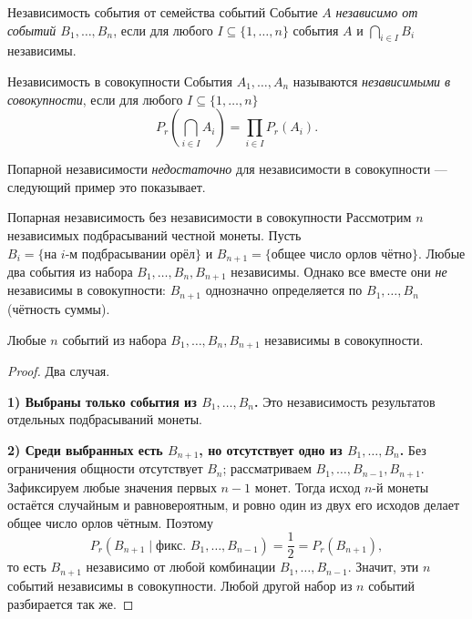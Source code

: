 \begin{Definition}{Независимость события от семейства событий}{}
	Событие \(A\) \textit{независимо от событий \(B_1,\dots,B_n\)}, если для любого $I\subseteq \{1,\dots,n\}$ события $A$ и $\bigcap_{i\in I} B_i$ независимы.
\end{Definition}

\begin{Definition}{Независимость в совокупности}{}
	События \(A_1,\dots,A_n\) называются \textit{независимыми в совокупности}, если для любого $I\subseteq \{1,\dots,n\}$
	\[
	P_r\!\left(\bigcap_{i\in I} A_i\right)=\prod_{i\in I} P_r(A_i).
	\]
\end{Definition}

\begin{Remark}{}{}
	Попарной независимости \emph{недостаточно} для независимости в совокупности — следующий пример это показывает.
\end{Remark}

\begin{Example}{Попарная независимость без независимости в совокупности}{}
	Рассмотрим \(n\) независимых подбрасываний честной монеты. Пусть $B_i=\{\text{на }i\text{-м подбрасывании орёл}\}$ и $B_{n+1}=\{\text{общее число орлов чётно}\}$. Любые два события из набора $B_1,\dots,B_n,B_{n+1}$ независимы. Однако все вместе они \emph{не} независимы в совокупности: $B_{n+1}$ однозначно определяется по $B_1,\dots,B_n$ (чётность суммы).
\end{Example}

\begin{Statement}{}{}
	Любые \(n\) событий из набора $B_1,\dots,B_n,B_{n+1}$ независимы в совокупности.
\end{Statement}

\begin{proof}
	Два случая.

	\textbf{1) Выбраны только события из \(B_1,\dots,B_n\).} Это независимость результатов отдельных подбрасываний монеты.

	\textbf{2) Среди выбранных есть \(B_{n+1}\), но отсутствует одно из \(B_1,\dots,B_n\).} Без ограничения общности отсутствует $B_n$; рассматриваем $B_1,\dots,B_{n-1},B_{n+1}$. Зафиксируем любые значения первых $n-1$ монет. Тогда исход $n$-й монеты остаётся случайным и равновероятным, и ровно один из двух его исходов делает общее число орлов чётным. Поэтому
	\[
	P_r(B_{n+1}\mid \text{фикс. }B_1,\dots,B_{n-1})=\frac12=P_r(B_{n+1}),
	\]
	то есть $B_{n+1}$ независимо от любой комбинации $B_1,\dots,B_{n-1}$. Значит, эти $n$ событий независимы в совокупности. Любой другой набор из $n$ событий разбирается так же.
\end{proof}

